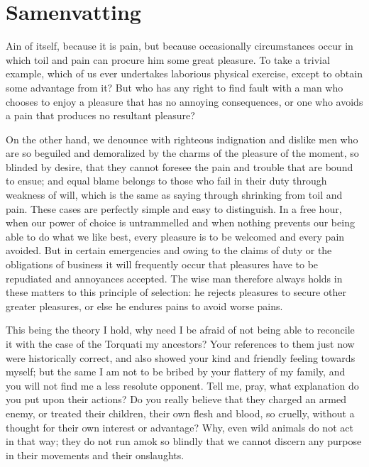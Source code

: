 \chapter*{Samenvatting}

{

Ain of itself, because it is pain, but because occasionally circumstances occur in which toil and pain can procure him some great pleasure. To take a trivial example, which of us ever undertakes laborious physical exercise, except to obtain some advantage from it? But who has any right to find fault with a man who chooses to enjoy a pleasure that has no annoying consequences, or one who avoids a pain that produces no resultant pleasure?

On the other hand, we denounce with righteous indignation and dislike men who are so beguiled and demoralized by the charms of the pleasure of the moment, so blinded by desire, that they cannot foresee the pain and trouble that are bound to ensue; and equal blame belongs to those who fail in their duty through weakness of will, which is the same as saying through shrinking from toil and pain. These cases are perfectly simple and easy to distinguish. In a free hour, when our power of choice is untrammelled and when nothing prevents our being able to do what we like best, every pleasure is to be welcomed and every pain avoided.
But in certain emergencies and owing to the claims of duty or the obligations of business it will frequently occur that pleasures have to be repudiated and annoyances accepted. The wise man therefore always holds in these matters to this principle of selection: he rejects pleasures to secure other greater pleasures, or else he endures pains to avoid worse pains.

This being the theory I hold, why need I be afraid of not being able to reconcile it with the case of the Torquati my ancestors? Your references to them just now were historically correct, and also showed your kind and friendly feeling towards myself; but the same I am not to be bribed by your flattery of my family, and you will not find me a less resolute opponent. Tell me, pray, what explanation do you put upon their actions? Do you really believe that they charged an armed enemy, or treated their children, their own flesh and blood, so cruelly, without a thought for their own interest or advantage? Why, even wild animals do not act in that way; they do not run amok so blindly that we cannot discern any purpose in their movements and their onslaughts.

}
